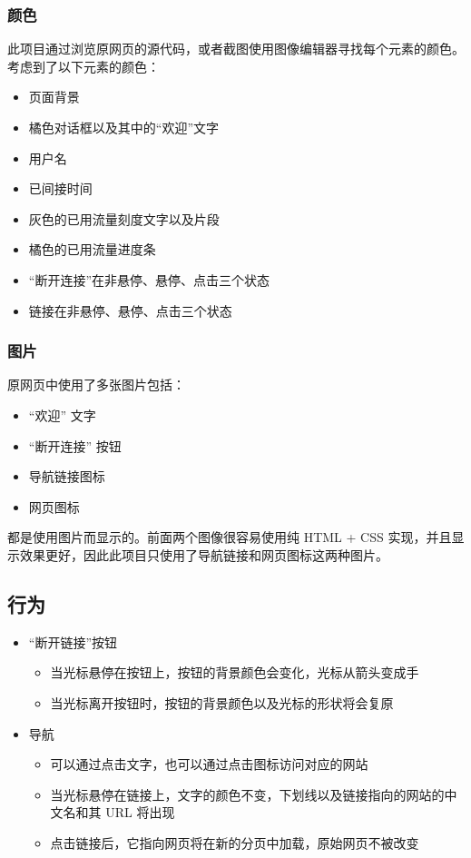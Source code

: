 \newpage

\subsubsection{颜色}

此项目通过浏览原网页的源代码，或者截图使用图像编辑器寻找每个元素的颜色。考虑到了以下元素的颜色：

\begin{itemize}
  \item 页面背景
  \item 橘色对话框以及其中的“欢迎”文字
  \item 用户名
  \item 已间接时间
  \item 灰色的已用流量刻度文字以及片段
  \item 橘色的已用流量进度条
  \item “断开连接”在非悬停、悬停、点击三个状态
  \item 链接在非悬停、悬停、点击三个状态
\end{itemize}

\subsubsection{图片}

原网页中使用了多张图片包括：

\begin{itemize}
  \item “欢迎” 文字
  \item “断开连接” 按钮
  \item 导航链接图标
  \item 网页图标
\end{itemize}

都是使用图片而显示的。前面两个图像很容易使用纯 HTML + CSS 实现，并且显示效果更好，因此此项目只使用了导航链接和网页图标这两种图片。

\newpage

\subsection{行为}

\begin{itemize}
  \item “断开链接”按钮
  \begin{itemize}
    \item 当光标悬停在按钮上，按钮的背景颜色会变化，光标从箭头变成手
    \item 当光标离开按钮时，按钮的背景颜色以及光标的形状将会复原
  \end{itemize}
  \item 导航
  \begin{itemize}
    \item 可以通过点击文字，也可以通过点击图标访问对应的网站
    \item 当光标悬停在链接上，文字的颜色不变，下划线以及链接指向的网站的中文名和其 URL 将出现
    \item 点击链接后，它指向网页将在新的分页中加载，原始网页不被改变
  \end{itemize}
\end{itemize}

